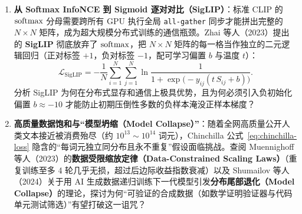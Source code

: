 \begin{enumerate}
  \item[\textbf{5.5.7}] \textbf{从 Softmax InfoNCE 到 Sigmoid 逐对对比（SigLIP）}：标准 CLIP 的 $\operatorname{softmax}$ 分母需要跨所有 GPU 执行全局 \texttt{all-gather} 同步才能拼出完整的 $N \times N$ 矩阵，成为超大规模分布式训练的通信瓶颈。Zhai 等人（2023）提出的 \textbf{SigLIP} 彻底放弃了 $\operatorname{softmax}$，把 $N \times N$ 矩阵的每一格当作独立的二元逻辑回归（正对标签 $+1$，负对标签 $-1$，配可学习偏置 $b$ 与温度 $t$）：
  \[
    \mathcal{L}_{\mathrm{SigLIP}} = -\frac{1}{N}\sum_{i=1}^{N}\sum_{j=1}^{N} \ln \frac{1}{1 + \exp\!\big(-y_{ij}(t\, S_{ij} + b)\big)}.
  \]
  分析 SigLIP 为何在分布式显存和通信上极具优势，且为何必须引入负初始化偏置 $b \approx -10$ 才能防止初期压倒性多数的负样本淹没正样本梯度？

  \item[\textbf{5.5.8}] \textbf{高质量数据饱和与“模型坍缩（Model Collapse）”}：随着全网高质量公开人类文本接近被消费殆尽（约 $10^{13}\sim 10^{14}$ 词元），Chinchilla 公式~\eqref{eq:chinchilla-loss} 隐含的“每词元独立同分布且永不重复”假设面临挑战。查阅 Muennighoff 等人（2023）的\textbf{数据受限缩放定律（Data-Constrained Scaling Laws）}（重复训练至多 4 轮几乎无损，超过后边际收益指数衰减）以及 Shumailov 等人（2024）关于用 AI 生成数据递归训练下一代模型引发\textbf{分布尾部退化（Model Collapse）}的理论，探讨为何“可验证的合成数据（如数学证明验证器与代码单元测试筛选）”有望打破这一诅咒？
\end{enumerate}
